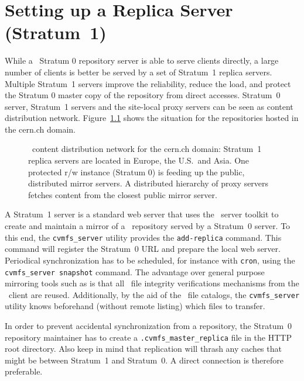 \chapter{Setting up a Replica Server (Stratum~1)}
\label{sct:replica}

While a \cvmfs\ Stratum 0 repository server is able to serve clients directly, a large number of clients is better be served by a set of Stratum~1 replica servers.
Multiple Stratum~1 servers improve the reliability, reduce the load, and protect the Stratum 0 master copy of the repository from direct accesses.
Stratum~0 server, Stratum~1 servers and the site-local proxy servers can be seen as content distribution network.
Figure~\ref{fig:stratum1} shows the situation for the repositories hosted in the cern.ch domain.

\begin{figure}
	\begin{center}
		\resizebox{\textwidth}{!}{}
	\end{center}
	\caption{\cvmfs\ content distribution network for the cern.ch domain: Stratum~1 replica servers are located in Europe, the U.S.\ and Asia.  
		One protected r/w instance (Stratum 0) is feeding up the public, distributed mirror servers. 
		A distributed hierarchy of proxy servers fetches content from the closest public mirror server.}
	\label{fig:stratum1}
\end{figure}

A Stratum~1 server is a standard web server that uses the \cvmfs\ server toolkit to create and maintain a mirror of a \cvmfs\ repository served by a Stratum~0 server.
To this end, the \texttt{cvmfs\_server} utility provides the \texttt{add-replica} command.
This command will register the Stratum~0 URL and prepare the local web server.
Periodical synchronization has to be scheduled, for instance with \texttt{cron}, using the \texttt{cvmfs\_server snapshot} command.
The advantage over general purpose mirroring tools such as  is that all \cvmfs\ file integrity verifications mechanisms from the \fuse\ client are reused.
Additionally, by the aid of the \cvmfs\ file catalogs, the \texttt{cvmfs\_server} utility knows beforehand (without remote listing) which files to transfer.

In order to prevent accidental synchronization from a repository, the Stratum~0 repository maintainer has to create a \texttt{.cvmfs\_master\_replica} file in the HTTP root directory.
Also keep in mind that replication will thrash any caches that might be between Stratum~1 and Stratum~0.
A direct connection is therefore preferable.

